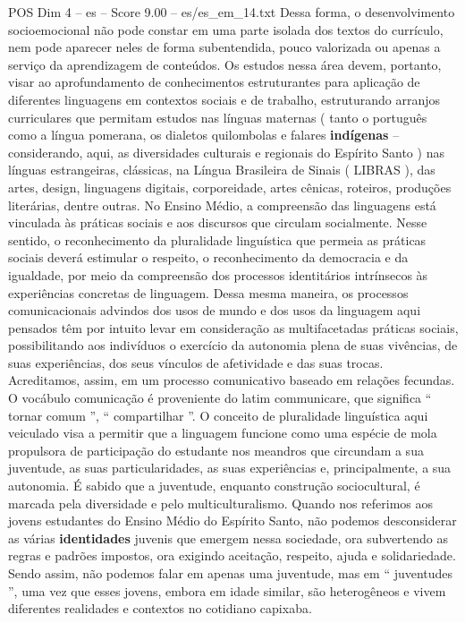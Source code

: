 \begin{textsample}{POS Dim 4 – es – Score 9.00 – es/es\_em\_14.txt}
Dessa forma, o desenvolvimento socioemocional não pode constar em uma parte isolada dos textos do currículo, nem pode aparecer neles de forma subentendida, pouco valorizada ou apenas a serviço da aprendizagem de conteúdos.
Os estudos nessa área devem, portanto, visar ao aprofundamento de conhecimentos estruturantes para aplicação de diferentes linguagens em contextos sociais e de trabalho, estruturando arranjos curriculares que permitam estudos nas línguas maternas ( tanto o português como a língua pomerana, os dialetos quilombolas e falares \textbf{indígenas} – considerando, aqui, as diversidades culturais e regionais do Espírito Santo ) nas línguas estrangeiras, clássicas, na Língua Brasileira de Sinais ( LIBRAS ), das artes, design, linguagens digitais, corporeidade, artes cênicas, roteiros, produções literárias, dentre outras.
No Ensino Médio, a compreensão das linguagens está vinculada às práticas sociais e aos discursos que circulam socialmente.
Nesse sentido, o reconhecimento da pluralidade linguística que permeia as práticas sociais deverá estimular o respeito, o reconhecimento da democracia e da igualdade, por meio da compreensão dos processos identitários intrínsecos às experiências concretas de linguagem.
Dessa mesma maneira, os processos comunicacionais advindos dos usos de mundo e dos usos da linguagem aqui pensados têm por intuito levar em consideração as multifacetadas práticas sociais, possibilitando aos indivíduos o exercício da autonomia plena de suas vivências, de suas experiências, dos seus vínculos de afetividade e das suas trocas.
Acreditamos, assim, em um processo comunicativo baseado em relações fecundas.
O vocábulo comunicação é proveniente do latim communicare, que significa “ tornar comum ”, “ compartilhar ”.
O conceito de pluralidade linguística aqui veiculado visa a permitir que a linguagem funcione como uma espécie de mola propulsora de participação do estudante nos meandros que circundam a sua juventude, as suas particularidades, as suas experiências e, principalmente, a sua autonomia.
É sabido que a juventude, enquanto construção sociocultural, é marcada pela diversidade e pelo multiculturalismo.
Quando nos referimos aos jovens estudantes do Ensino Médio do Espírito Santo, não podemos desconsiderar as várias \textbf{identidades} juvenis que emergem nessa sociedade, ora subvertendo as regras e padrões impostos, ora exigindo aceitação, respeito, ajuda e solidariedade.
Sendo assim, não podemos falar em apenas uma juventude, mas em “ juventudes ”, uma vez que esses jovens, embora em idade similar, são heterogêneos e vivem diferentes realidades e contextos no cotidiano capixaba.

\end{textsample}
